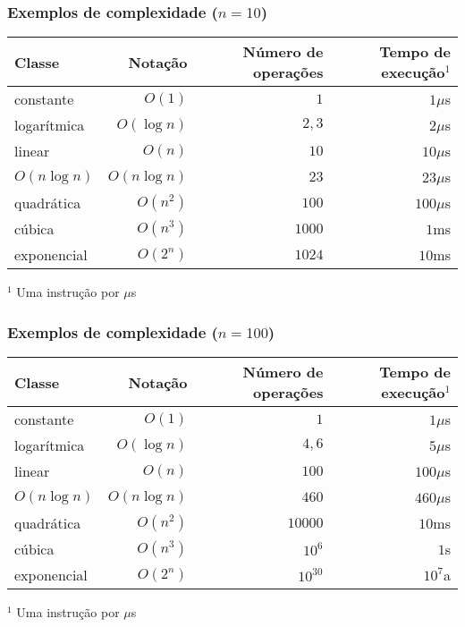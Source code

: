 \begin{frame}

	\frametitle{Exemplos de complexidade ($n = 10$)}
	\begin{small}

	\begin{table}[ht]
	\centering
	\begin{tabular}{lrrr}
	\toprule
	\textbf{Classe} & \textbf{Notação} & \textbf{Número de operações} 
	& \textbf{Tempo de execução$^1$} \\
	\toprule
	constante & $O(1)$ & $1$ & $1\mu$s \\
	logarítmica & $O(\log n)$ & $2,3$ & $2\mu$s \\
	linear & $O(n)$ & $10$ & $10\mu$s \\
	$O(n\log n)$ & $O(n\log n)$ & $23$ & $23\mu$s \\
	quadrática & $O(n^2)$ & $100$ & $100\mu$s \\
	cúbica & $O(n^3)$ & $1000$ & $1$ms \\
	exponencial & $O(2^n)$ & $1024$ & $10$ms \\
	\bottomrule
	\end{tabular}
	\end{table}
	$^1$ Uma instrução por $\mu$s

	\end{small}

\end{frame}

\begin{frame}

	\frametitle{Exemplos de complexidade ($n = 100$)}
	\begin{small}

	\begin{table}[ht]
	\centering
	\begin{tabular}{lrrr}
	\toprule
	\textbf{Classe} & \textbf{Notação} & \textbf{Número de operações} 
	& \textbf{Tempo de execução$^1$} \\
	\toprule
	constante & $O(1)$ & $1$ & $1\mu$s \\
	logarítmica & $O(\log n)$ & $4,6$ & $5\mu$s \\
	linear & $O(n)$ & $100$ & $100\mu$s \\
	$O(n\log n)$ & $O(n\log n)$ & $460$ & $460\mu$s \\
	quadrática & $O(n^2)$ &$ 10000$ & $10$ms \\
	cúbica & $O(n^3)$ & $10^6$ & $1$s \\
	exponencial & $O(2^n)$ & $10^{30}$ & $10^7$a \\
	\bottomrule
	\end{tabular}
	\end{table}
	$^1$ Uma instrução por $\mu$s

	\end{small}

\end{frame}

